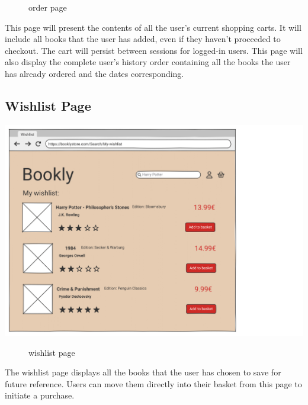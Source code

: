 \begin{figure}[h!]
    \centering
    \caption{order page}
    \label{fig:enter-label}
\end{figure}
This page will present the contents of all the user's current shopping carts. It will include all books that the user has added, even if they haven't proceeded to checkout. The cart will persist between sessions for logged-in users. This page will also display the complete user's history order containing all the books the user has already ordered and the dates corresponding. 


\subsection{Wishlist Page} \label{sec:wishlist}
\includegraphics[width=0.6\linewidth]{HW1Report/photos/wishlist.png}

\begin{figure}[h!]
    \centering
    \caption{wishlist page}
    \label{fig:enter-label}
\end{figure}
The wishlist page displays all the books that the user has chosen to save for future reference. Users can move them directly into their basket from this page to initiate a purchase.
